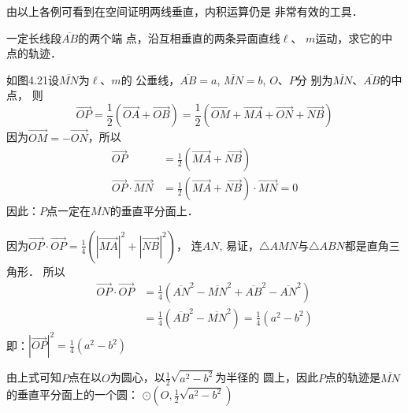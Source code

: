 由以上各例可看到在空间证明两线垂直，内积运算仍是
非常有效的工具．

\begin{example}
    一定长线段$\overline{AB}$的两个端
    点，沿互相垂直的两条异面直线$\ell$、
    $m$运动，求它的中点的轨迹．
\end{example}

\begin{solution}
    如图4.21设$\overline{MN}$为$\ell$、$m$的
公垂线，$\overline{AB}=a$, $\overline{MN}=b$, $O$、$P$分
别为$\overline{MN}$、$\overline{AB}$的中点，
则
\[\Vec{OP}=\frac{1}{2}\left(\Vec{OA}+\Vec{OB}\right)=\frac{1}{2}\left(\Vec{OM}+\Vec{MA}+\Vec{ON}+\Vec{NB}\right)\]
因为$\Vec{OM}=-\Vec{ON}$，所以
\[\begin{split}
    \Vec{OP}&=\frac{1}{2}(\Vec{MA}+\Vec{NB})\\
    \Vec{OP}\cdot\Vec{MN}&=\frac{1}{2}\left(\Vec{MA}+\Vec{NB}\right)\cdot \Vec{MN}=0
\end{split}    \]
因此：$P$点一定在$\overline{MN}$的垂直平分面上．

因为$\Vec{OP}\cdot \Vec{OP}=\frac{1}{4}(|\Vec{MA}|^2+|\Vec{NB}|^2)$，
连$AN$, 易证，$\triangle AMN$与$\triangle ABN$都是直角三角形．
所以
\[\begin{split}
    \Vec{OP}\cdot \Vec{OP}&=\frac{1}{4}\left(\overline{AN}^2-\overline{MN}^2+\overline{AB}^2-\overline{AN}^2\right)\\
    &=\frac{1}{4}\left(\overline{AB}^2-\overline{MN}^2\right)=\frac{1}{4}(a^2-b^2)
\end{split}\]
即：$|\Vec{OP}|^2=\frac{1}{4}(a^2-b^2)$

由上式可知$P$点在以$O$为圆心，以$\frac{1}{2}\sqrt{a^2-b^2}$为半径的
圆上，因此$P$点的轨迹是$\overline{MN}$的垂直平分面上的一个圆：
$\odot\left(O,\frac{1}{2}\sqrt{a^2-b^2}\right)$
\end{solution}

\begin{figure}[htp]\centering
    \begin{minipage}[t]{0.48\textwidth}
    \centering
{}
    \caption{}
    \end{minipage}
    \begin{minipage}[t]{0.48\textwidth}
    \centering
    \caption{}
    \end{minipage}
    \end{figure}

